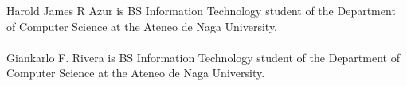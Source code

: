 \begin{vita}

Harold James R Azur is BS Information Technology student of the Department of Computer Science at the Ateneo de Naga University.
\\
\\
Giankarlo F. Rivera is BS Information Technology student of the Department of Computer Science at the Ateneo de Naga University.

\end{vita}